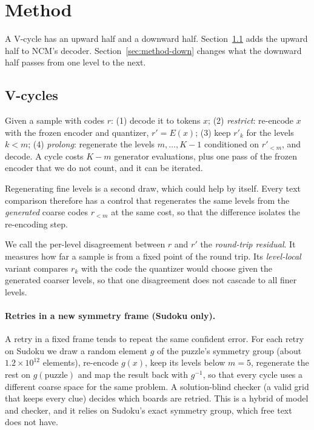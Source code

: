 \documentclass[11pt]{article}
\begin{document}
\section{Method}
\label{sec:method}

A V-cycle has an upward half and a downward half. Section~\ref{sec:method-up} adds the upward half to NCM's decoder.
Section~\ref{sec:method-down} changes what the downward half passes from one level to the next.

\subsection{V-cycles}
\label{sec:method-up}

Given a sample with codes $r$: (1) decode it to tokens $x$; (2) \emph{restrict}: re-encode $x$
with the frozen encoder and quantizer, $r'=E(x)$; (3) keep $r'_k$ for the levels $k<m$; (4) \emph{prolong}: regenerate
the levels $m,\dots,K-1$ conditioned on $r'_{<m}$, and decode. A cycle costs $K-m$ generator evaluations, plus one
pass of the frozen encoder that we do not count, and it can be iterated.

Regenerating fine levels is a second draw, which could help by itself. Every text comparison
therefore has a control that regenerates the same levels from the \emph{generated} coarse codes $r_{<m}$ at the same
cost, so that the difference isolates the re-encoding step.

We call the per-level disagreement between $r$ and $r'$ the \emph{round-trip residual}. It measures how far a sample is from
a fixed point of the round trip. Its \emph{level-local} variant compares $r_k$ with the code the quantizer would choose
given the generated coarser levels, so that one disagreement does not cascade to all finer levels.

\paragraph{Retries in a new symmetry frame (Sudoku only).} A retry in a fixed frame tends to repeat the same confident
error. For each retry on Sudoku we draw a random element $g$ of the puzzle's symmetry group (about $1.2\times10^{12}$
elements), re-encode $g(x)$, keep its levels below $m=5$, regenerate the rest on $g(\text{puzzle})$ and map the result
back with $g^{-1}$, so that every cycle uses a different coarse space for the same problem. A solution-blind checker (a
valid grid that keeps every clue) decides which boards are retried. This is a hybrid of model and checker, and it
relies on Sudoku's exact symmetry group, which free text does not have.
\end{document}
